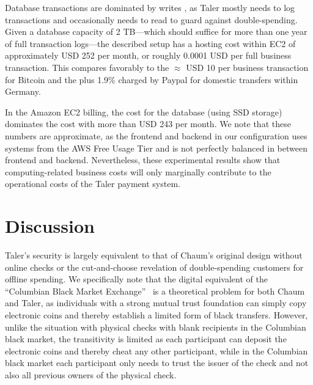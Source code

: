 \documentclass{llncs}
\begin{document}
Database transactions are dominated by writes
, as Taler mostly needs to log
transactions and occasionally needs to read to guard against
double-spending.  Given a database capacity of 2 TB---which should
suffice for more than one year of full transaction logs---the
described setup has a hosting cost within EC2 of approximately USD 252
per month, or roughly 0.0001 USD per full business transaction.  This
compares favorably to the $\approx$ USD 10 per business transaction
for Bitcoin and the  plus 1.9\% charged by Paypal for
domestic transfers within Germany.

In the Amazon EC2 billing, the cost for the database (using SSD
storage) dominates the cost with more than USD 243 per month.  We note
that these numbers are approximate, as the frontend and backend in our
configuration uses systems from the AWS Free Usage Tier and is not
perfectly balanced in between frontend and backend.  Nevertheless,
these experimental results show that computing-related business costs
will only marginally contribute to the operational costs of the Taler
payment system.



\section{Discussion}


Taler's security is largely equivalent to that of Chaum's original
design without online checks or the cut-and-choose revelation of
double-spending customers for offline spending.
We specifically note that the digital equivalent of the ``Columbian
Black Market Exchange''~\cite{fatf1997} is a theoretical problem for
both Chaum and Taler, as individuals with a strong mutual trust
foundation can simply copy electronic coins and thereby establish a
limited form of black transfers.  However, unlike the situation with
physical checks with blank recipients in the Columbian black market,
the transitivity is limited as each participant can deposit the electronic
coins and thereby cheat any other participant, while in the Columbian
black market each participant only needs to trust the issuer of the
check and not also all previous owners of the physical check.
\end{document}
